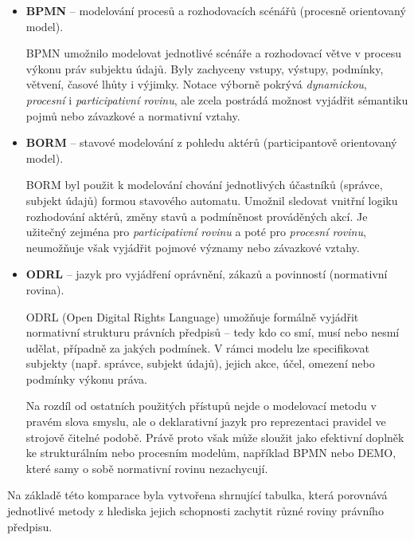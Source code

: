 \begin{itemize}
  \item \textbf{BPMN} – modelování procesů a rozhodovacích scénářů (procesně orientovaný model).

  BPMN umožnilo modelovat jednotlivé scénáře a rozhodovací větve v procesu výkonu práv subjektu údajů. Byly zachyceny vstupy, výstupy, podmínky, větvení, časové lhůty i výjimky. Notace výborně pokrývá \textit{dynamickou}, \textit{procesní} i \textit{participativní rovinu}, ale zcela postrádá možnost vyjádřit sémantiku pojmů nebo závazkové a normativní vztahy.

  \item \textbf{BORM} – stavové modelování z pohledu aktérů (participantově orientovaný model).

  BORM byl použit k modelování chování jednotlivých účastníků (správce, subjekt údajů) formou stavového automatu. Umožnil sledovat vnitřní logiku rozhodování aktérů, změny stavů a podmíněnost prováděných akcí. Je užitečný zejména pro \textit{participativní rovinu} a poté pro \textit{procesní rovinu}, neumožňuje však vyjádřit pojmové významy nebo závazkové vztahy.

  \item \textbf{ODRL} – jazyk pro vyjádření oprávnění, zákazů a povinností (normativní rovina).

  ODRL (Open Digital Rights Language) umožňuje formálně vyjádřit normativní strukturu právních předpisů – tedy kdo co smí, musí nebo nesmí udělat, případně za jakých podmínek. V rámci modelu lze specifikovat subjekty (např. správce, subjekt údajů), jejich akce, účel, omezení nebo podmínky výkonu práva.

  Na rozdíl od ostatních použitých přístupů nejde o modelovací metodu v pravém slova smyslu, ale o deklarativní jazyk pro reprezentaci pravidel ve strojově čitelné podobě. Právě proto však může sloužit jako efektivní doplněk ke strukturálním nebo procesním modelům, například BPMN nebo DEMO, které samy o sobě normativní rovinu nezachycují.
\end{itemize}

Na základě této komparace byla vytvořena shrnující tabulka, která porovnává jednotlivé metody z hlediska jejich schopnosti zachytit různé roviny právního předpisu.

